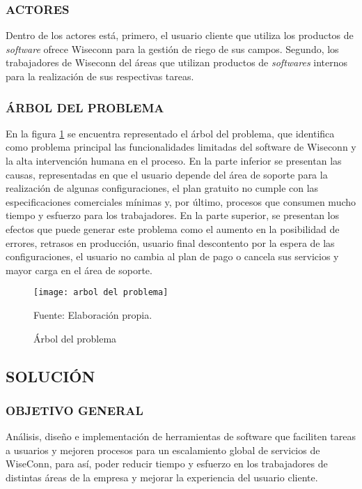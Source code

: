 \subsubsection{ACTORES}
Dentro de los actores está, primero, el usuario cliente que utiliza los productos de \textit{software} ofrece Wiseconn para la gestión de riego de sus campos. Segundo, los trabajadores de Wiseconn del áreas que utilizan productos de \textit{softwares} internos para la realización de sus respectivas tareas.

\subsubsection{ÁRBOL DEL PROBLEMA}
En la figura \ref{fig:arbolproblema} se encuentra representado el árbol del problema, que identifica como problema principal las funcionalidades limitadas del software de Wiseconn y la alta intervención humana en el proceso.
En la parte inferior se presentan las causas, representadas en que el usuario depende del área de soporte para la realización de algunas configuraciones, el plan gratuito no cumple con las especificaciones comerciales mínimas y, por último, procesos que consumen mucho tiempo y esfuerzo para los trabajadores.
En la parte superior, se presentan los efectos que puede generar este problema como el aumento en la posibilidad de errores, retrasos en producción, usuario final descontento por la espera de las configuraciones, el usuario no cambia al plan de pago o cancela sus servicios y mayor carga en el área de soporte.

\begin{figure}
    \centering
	\texttt{[image: arbol del problema]}
	\caption{\label{fig:arbolproblema} Árbol del problema} Fuente: Elaboración propia.
\end{figure}

\subsection{SOLUCIÓN}

\subsubsection{OBJETIVO GENERAL}

Análisis, diseño e implementación de herramientas de software que faciliten tareas a usuarios y mejoren procesos para un escalamiento global de servicios de WiseConn, para así, poder reducir tiempo y esfuerzo en los trabajadores de distintas áreas de la empresa y mejorar la experiencia del usuario cliente.

